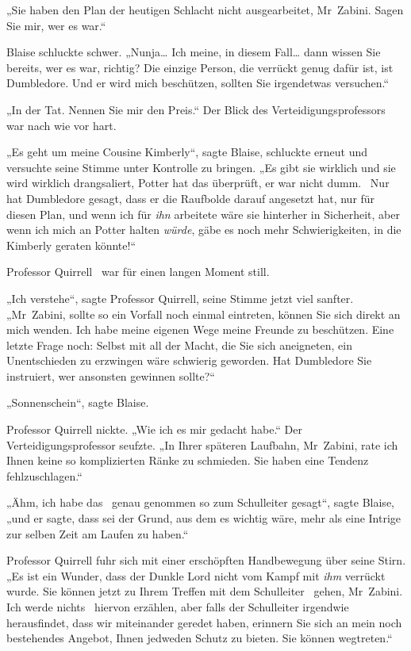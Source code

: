 {„Sie haben den Plan der heutigen Schlacht nicht ausgearbeitet, Mr~Zabini. Sagen Sie mir, wer es war.“

Blaise schluckte schwer. „Nunja… Ich meine, in diesem Fall… dann wissen Sie bereits, wer es war, richtig? Die einzige Person, die verrückt genug dafür ist, ist Dumbledore. Und er wird mich beschützen, sollten Sie irgendetwas versuchen.“

„In der Tat. Nennen Sie mir den Preis.“ Der Blick des Verteidigungsprofessors war nach wie vor hart.

„Es geht um meine Cousine Kimberly“, sagte Blaise, schluckte erneut und versuchte seine Stimme unter Kontrolle zu bringen. „Es gibt sie wirklich und sie wird wirklich drangsaliert, Potter hat das überprüft, er war nicht dumm. ~Nur hat Dumbledore gesagt, dass er die Raufbolde darauf angesetzt hat, nur für diesen Plan, und wenn ich für \emph{ihn} arbeitete wäre sie hinterher in Sicherheit, aber wenn ich mich an Potter halten \emph{würde}, gäbe es noch mehr Schwierigkeiten, in die Kimberly geraten könnte!“

Professor Quirrell ~war für einen langen Moment still.

„Ich verstehe“, sagte Professor Quirrell, seine Stimme jetzt viel sanfter. „Mr~Zabini, sollte so ein Vorfall noch einmal eintreten, können Sie sich direkt an mich wenden. Ich habe meine eigenen Wege meine Freunde zu beschützen. Eine letzte Frage noch: Selbst mit all der Macht, die Sie sich aneigneten, ein Unentschieden zu erzwingen wäre schwierig geworden. Hat Dumbledore Sie instruiert, wer ansonsten gewinnen sollte?“

„Sonnenschein“, sagte Blaise.

Professor Quirrell nickte. „Wie ich es mir gedacht habe.“ Der Verteidigungsprofessor seufzte. „In Ihrer späteren Laufbahn, Mr~Zabini, rate ich Ihnen keine so komplizierten Ränke zu schmieden. Sie haben eine Tendenz fehlzuschlagen.“

„Ähm, ich habe das ~genau genommen so zum Schulleiter gesagt“, sagte Blaise, „und er sagte, dass sei der Grund, aus dem es wichtig wäre, mehr als eine Intrige zur selben Zeit am Laufen zu haben.“

Professor Quirrell fuhr sich mit einer erschöpften Handbewegung über seine Stirn. „Es ist ein Wunder, dass der Dunkle Lord nicht vom Kampf mit \emph{ihm} verrückt wurde. Sie können jetzt zu Ihrem Treffen mit dem Schulleiter ~gehen, Mr~Zabini. Ich werde nichts ~hiervon erzählen, aber falls der Schulleiter irgendwie herausfindet, dass wir miteinander geredet haben, erinnern Sie sich an mein noch bestehendes Angebot, Ihnen jedweden Schutz zu bieten. Sie können wegtreten.“

}
